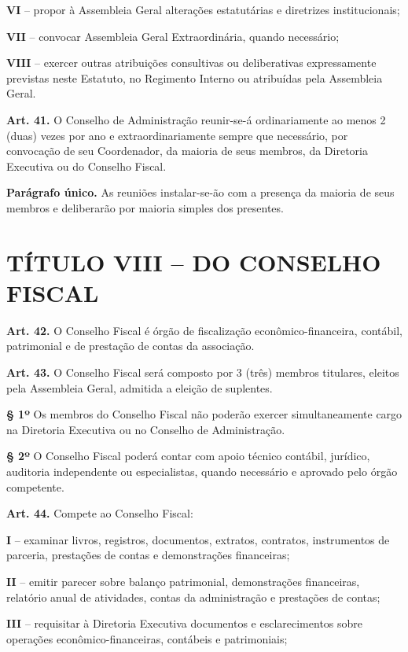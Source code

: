 \documentclass[11pt,a4paper]{article}
\begin{document}
\textbf{VI} -- propor à Assembleia Geral alterações estatutárias e diretrizes institucionais;

\textbf{VII} -- convocar Assembleia Geral Extraordinária, quando necessário;

\textbf{VIII} -- exercer outras atribuições consultivas ou deliberativas expressamente previstas neste Estatuto, no Regimento Interno ou atribuídas pela Assembleia Geral.

\textbf{Art. 41.} O Conselho de Administração reunir-se-á ordinariamente ao menos 2 (duas) vezes por ano e extraordinariamente sempre que necessário, por convocação de seu Coordenador, da maioria de seus membros, da Diretoria Executiva ou do Conselho Fiscal.

\textbf{Parágrafo único.} As reuniões instalar-se-ão com a presença da maioria de seus membros e deliberarão por maioria simples dos presentes.

\section*{TÍTULO VIII -- DO CONSELHO FISCAL}

\textbf{Art. 42.} O Conselho Fiscal é órgão de fiscalização econômico-financeira, contábil, patrimonial e de prestação de contas da associação.

\textbf{Art. 43.} O Conselho Fiscal será composto por 3 (três) membros titulares, eleitos pela Assembleia Geral, admitida a eleição de suplentes.

\textbf{§ 1º} Os membros do Conselho Fiscal não poderão exercer simultaneamente cargo na Diretoria Executiva ou no Conselho de Administração.

\textbf{§ 2º} O Conselho Fiscal poderá contar com apoio técnico contábil, jurídico, auditoria independente ou especialistas, quando necessário e aprovado pelo órgão competente.

\textbf{Art. 44.} Compete ao Conselho Fiscal:

\textbf{I} -- examinar livros, registros, documentos, extratos, contratos, instrumentos de parceria, prestações de contas e demonstrações financeiras;

\textbf{II} -- emitir parecer sobre balanço patrimonial, demonstrações financeiras, relatório anual de atividades, contas da administração e prestações de contas;

\textbf{III} -- requisitar à Diretoria Executiva documentos e esclarecimentos sobre operações econômico-financeiras, contábeis e patrimoniais;
\end{document}

